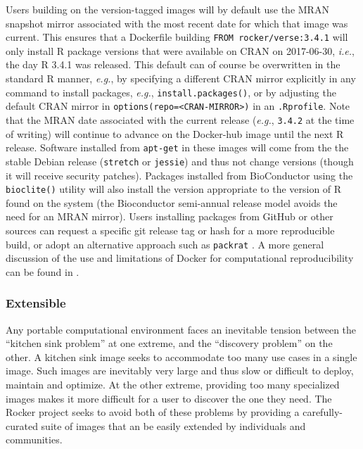 Users building on the version-tagged images will by default use the MRAN
snapshot mirror \citep{MRAN} associated with the most recent date for
which that image was current. This ensures that a Dockerfile building
\texttt{FROM\ rocker/verse:3.4.1} will only install R package versions
that were available on CRAN on 2017-06-30, \emph{i.e.}, the day R 3.4.1
was released. This default can of course be overwritten in the standard
R manner, \emph{e.g.}, by specifying a different CRAN mirror explicitly
in any command to install packages, \emph{e.g.},
\texttt{install.packages()}, or by adjusting the default CRAN mirror in
\texttt{options(repo=\textless{}CRAN-MIRROR\textgreater{})} in an
\texttt{.Rprofile}. Note that the MRAN date associated with the current
release (\emph{e.g.}, \texttt{3.4.2} at the time of writing) will
continue to advance on the Docker-hub image until the next R release.
Software installed from \texttt{apt-get} in these images will come from
the the stable Debian release (\texttt{stretch} or \texttt{jessie}) and
thus not change versions (though it will receive security patches).
Packages installed from BioConductor using the \texttt{bioclite()}
utility will also install the version appropriate to the version of R
found on the system (the Bioconductor semi-annual release model avoids
the need for an MRAN mirror). Users installing packages from GitHub or
other sources can request a specific git release tag or hash for a more
reproducible build, or adopt an alternative approach such as
\texttt{packrat} \citep{packrat}. A more general discussion of the use
and limitations of Docker for computational reproducibility can be found
in \cite{Boettiger2015}.

\subsubsection{Extensible}\label{extensible}

Any portable computational environment faces an inevitable tension
between the ``kitchen sink problem'' at one extreme, and the ``discovery
problem'' on the other. A kitchen sink image seeks to accommodate too
many use cases in a single image. Such images are inevitably very large
and thus slow or difficult to deploy, maintain and optimize. At the
other extreme, providing too many specialized images makes it more
difficult for a user to discover the one they need. The Rocker project
seeks to avoid both of these problems by providing a carefully-curated
suite of images that an be easily extended by individuals and
communities.

